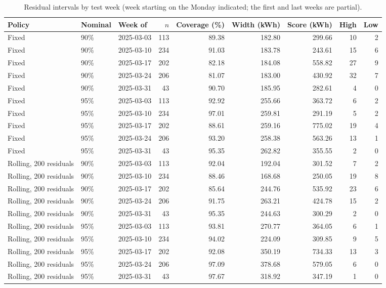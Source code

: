 \begin{table}[!htbp]\centering\footnotesize
\caption{Residual intervals by test week (week starting on the Monday indicated; the first and last weeks are partial).}\label{tab:s_intervals_week}
\begin{tabular}{@{}lllrrrrrr@{}}\toprule
Policy & Nominal & Week of & $n$ & Coverage (\%) & Width (kWh) & Score (kWh) & High & Low \\\midrule
Fixed & 90\% & 2025-03-03 & 113 & 89.38 & 182.80 & 299.66 & 10 & 2 \\
Fixed & 90\% & 2025-03-10 & 234 & 91.03 & 183.78 & 243.61 & 15 & 6 \\
Fixed & 90\% & 2025-03-17 & 202 & 82.18 & 184.08 & 558.82 & 27 & 9 \\
Fixed & 90\% & 2025-03-24 & 206 & 81.07 & 183.00 & 430.92 & 32 & 7 \\
Fixed & 90\% & 2025-03-31 & 43 & 90.70 & 185.95 & 282.61 & 4 & 0 \\
Fixed & 95\% & 2025-03-03 & 113 & 92.92 & 255.66 & 363.72 & 6 & 2 \\
Fixed & 95\% & 2025-03-10 & 234 & 97.01 & 259.81 & 291.19 & 5 & 2 \\
Fixed & 95\% & 2025-03-17 & 202 & 88.61 & 259.16 & 775.02 & 19 & 4 \\
Fixed & 95\% & 2025-03-24 & 206 & 93.20 & 258.38 & 563.26 & 13 & 1 \\
Fixed & 95\% & 2025-03-31 & 43 & 95.35 & 262.82 & 355.55 & 2 & 0 \\
Rolling, 200 residuals & 90\% & 2025-03-03 & 113 & 92.04 & 192.04 & 301.52 & 7 & 2 \\
Rolling, 200 residuals & 90\% & 2025-03-10 & 234 & 88.46 & 168.68 & 250.05 & 19 & 8 \\
Rolling, 200 residuals & 90\% & 2025-03-17 & 202 & 85.64 & 244.76 & 535.92 & 23 & 6 \\
Rolling, 200 residuals & 90\% & 2025-03-24 & 206 & 91.75 & 263.21 & 424.78 & 15 & 2 \\
Rolling, 200 residuals & 90\% & 2025-03-31 & 43 & 95.35 & 244.63 & 300.29 & 2 & 0 \\
Rolling, 200 residuals & 95\% & 2025-03-03 & 113 & 93.81 & 270.77 & 364.05 & 6 & 1 \\
Rolling, 200 residuals & 95\% & 2025-03-10 & 234 & 94.02 & 224.09 & 309.85 & 9 & 5 \\
Rolling, 200 residuals & 95\% & 2025-03-17 & 202 & 92.08 & 350.19 & 734.33 & 13 & 3 \\
Rolling, 200 residuals & 95\% & 2025-03-24 & 206 & 97.09 & 378.68 & 579.05 & 6 & 0 \\
Rolling, 200 residuals & 95\% & 2025-03-31 & 43 & 97.67 & 318.92 & 347.19 & 1 & 0 \\
\bottomrule
\end{tabular}
\end{table}
